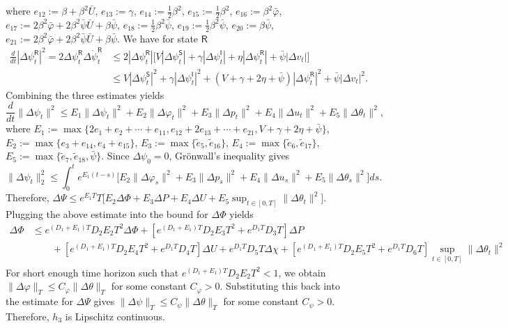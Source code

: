 \documentclass[letterpaper, 10 pt, conference]{ieeeconf}  %
\def\sS{\mathsf{S}}
\def\sI{\mathsf{I}}
\def\sR{\mathsf{R}}
\begin{document}
where $e_{12}:=\beta+\beta^2 \bar{U}$, $e_{13}:=\gamma$, $e_{14}:=\frac{1}{2}\beta^2$, $e_{15}:=\frac{1}{2}\beta^2$, $e_{16}:=\beta^2 \bar{\varphi}$, $e_{17}:=2\beta^2\bar{\varphi}+2\beta^2\bar{\psi}\bar{U}+\beta \bar{\psi}$, $e_{18}:=\frac{1}{2}\beta^2 \bar{\psi}$, $e_{19}:=\frac{1}{2}\beta^2 \bar{\psi}$, $e_{20}:=\beta \bar{\psi}$, $e_{21}:=2\beta^2\bar{\varphi}+2\beta^2\bar{\psi}\bar{U}+\beta \bar{\psi}$. We have for state $\sR$
$$
\begin{aligned}
\frac{d}{dt} |\Delta \psi_t^{\sR}|^2
= 2\Delta \psi_t^{\sR}\Delta \dot \psi_t^{\sR} & \leq 2|\Delta \psi_t^{\sR}|
\big[
V|\Delta \psi_t^{\sS}| + \gamma|\Delta \psi_t^{\sI}| + \eta|\Delta \psi_t^{\sR}| + \bar{\psi}|\Delta v_t|
\big] \\
&\leq V|\Delta \psi_t^{\sS}|^2 + \gamma|\Delta \psi_t^{\sI}|^2 + (V+\gamma+2\eta+\bar{\psi})|\Delta \psi_t^{\sR}|^2 + \bar{\psi}|\Delta v_t|^2.
\end{aligned}
$$
Combining the three estimates yields
$$
\frac{d}{dt}\|\Delta \psi_t\|^2 \le E_1\|\Delta \psi_t\|^2 + E_2\|\Delta \varphi_t\|^2 + E_3\|\Delta p_t\|^2 + E_4\|\Delta u_t\|^2 + E_5\|\Delta \theta_t\|^2,
$$
where $E_1:=\max\{
  2e_1 + e_2 + \cdots + e_{11},
  e_{12} + 2e_{13} + \cdots + e_{21},
  V + \gamma + 2\eta + \bar{\psi}\}$, $E_2:=\max\{e_3+e_{14}, e_4+e_{15}\}$, $E_3:=\max\{\tilde{e}_5,\tilde{e}_{16}\}$, $E_4:=\max\{\tilde{e}_6,\tilde{e}_{17}\}$, $E_5:=\max\{\tilde{e}_7, \tilde{e}_{18},\bar{\psi}\}$. Since $\Delta \psi_0 = 0$, Gr\"onwall's inequality gives
$$\|\Delta \psi_t\|_2^2 \leq \int_0^t e^{E_1(t-s)}
\big[
E_2\|\Delta \varphi_s\|^2 + E_3\|\Delta p_s\|^2 + E_4\|\Delta u_s\|^2 + E_5\|\Delta \theta_s\|^2
\big] ds.$$
Therefore, $\Delta \Psi \le e^{E_1T}T\big[E_2\Delta \Phi + E_3\Delta P + E_4\Delta U + E_5\sup_{t\in[0,T]}\|\Delta \theta_t\|^2\big]$. Plugging the above estimate into the bound for $\Delta \Phi$ yields
\begin{equation*}
    \begin{aligned}
        \Delta \Phi & \leq e^{(D_1+E_1)T}D_2E_2T^2\Delta \Phi + [e^{(D_1+E_1)T}D_2E_3T^2 + e^{D_1T}D_3T]\Delta P \\ & \quad \quad + [e^{(D_1+E_1)T}D_2E_4T^2 + e^{D_1T}D_4T]\Delta U + e^{D_1T}D_5T\Delta \chi + [e^{(D_1+E_1)T}D_2E_5T^2 + e^{D_1T}D_6T]\sup_{t\in[0,T]}\|\Delta \theta_t\|^2
    \end{aligned}
\end{equation*}
For short enough time horizon such that $e^{(D_1+E_1)T}D_2E_2T^2 < 1$,
we obtain $\|\Delta \varphi\|_T \leq C_\varphi \|\Delta \theta\|_T$
for some constant $C_{\varphi} > 0$. Substituting this back into the estimate for $\Delta \Psi$ gives
$\|\Delta \psi\|_T \leq C_\psi \|\Delta \theta
\|_T$ for some constant $C_\psi > 0$. Therefore, $h_3$ is Lipschitz continuous.
\end{document}
